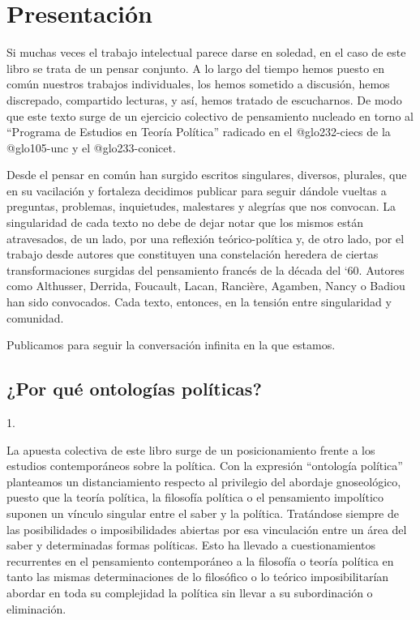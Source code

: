 





\chapter{Presentación}

Si muchas veces el trabajo intelectual parece darse en soledad, en el caso de este libro se trata de un pensar conjunto. A lo largo del tiempo hemos puesto en común nuestros trabajos individuales, los hemos sometido a discusión, hemos discrepado, compartido lecturas, y así, hemos tratado de escucharnos. De modo que este texto surge de un ejercicio colectivo de pensamiento nucleado en torno al \enquote{Programa de Estudios en Teoría Política} radicado en el \gls{@glo232-ciecs} de la \gls{@glo105-unc} y el \gls{@glo233-conicet}.

Desde el pensar en común han surgido escritos singulares, diversos, plurales, que en su vacilación y fortaleza decidimos publicar para seguir dándole vueltas a preguntas, problemas, inquietudes, malestares y alegrías que nos convocan. La singularidad de cada texto no debe de dejar notar que los mismos están atravesados, de un lado, por una reflexión teórico-política y, de otro lado, por el trabajo desde autores que constituyen una constelación heredera de ciertas transformaciones surgidas del pensamiento francés de la década del `60. Autores como Althusser, Derrida, Foucault, Lacan, Rancière, Agamben, Nancy o Badiou han sido convocados. Cada texto, entonces, en la tensión entre singularidad y comunidad.

Publicamos para seguir la conversación infinita en la que estamos.

\section*{¿Por qué ontologías políticas?}

1.

La apuesta colectiva de este libro surge de un posicionamiento frente a los estudios contemporáneos sobre la política. Con la expresión \enquote{ontología política} planteamos un distanciamiento respecto al privilegio del abordaje gnoseológico, puesto que la teoría política, la filosofía política o el pensamiento impolítico suponen un vínculo singular entre el saber y la política. Tratándose siempre de las posibilidades o imposibilidades abiertas por esa vinculación entre un área del saber y determinadas formas políticas. Esto ha llevado a cuestionamientos recurrentes en el pensamiento contemporáneo a la filosofía o teoría política en tanto las mismas determinaciones de lo filosófico o lo teórico imposibilitarían abordar en toda su complejidad la política sin llevar a su subordinación o eliminación.

